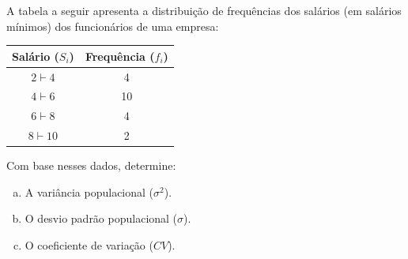 %
%


\begin{exercicioBanco}[\valorquestao]
A tabela a seguir apresenta a distribuição de frequências dos salários (em salários mínimos) dos funcionários de uma empresa:

\begin{center}
\begin{tabular}{|c|c|}
\hline
Salário ($S_i$) & Frequência ($f_i$) \\ \hline
$2 \vdash 4$ & 4 \\ \hline
$4 \vdash 6$ & 10 \\ \hline
$6 \vdash 8$ & 4 \\ \hline
$8 \vdash 10$ & 2 \\ \hline
\end{tabular}
\end{center}

Com base nesses dados, determine:

\begin{enumerate}[(a)]
    \item A variância populacional ($\sigma^2$).
    \item O desvio padrão populacional ($\sigma$).
    \item O coeficiente de variação ($CV$).
\end{enumerate}
\end{exercicioBanco}
